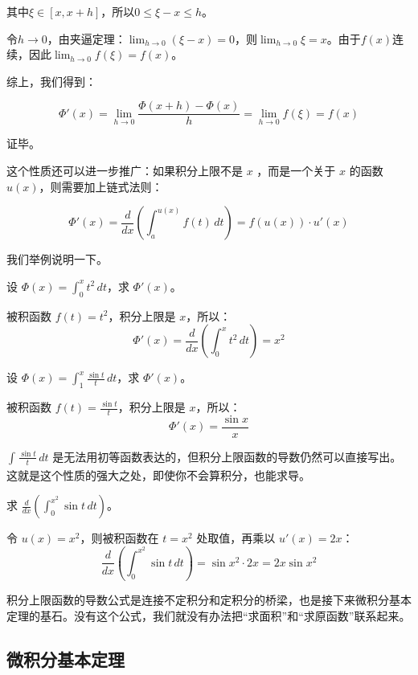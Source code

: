 其中$\xi \in [x,x+h]$，所以$0\leq \xi -x\leq h$。

令$h\rightarrow 0$，由夹逼定理：$\lim_{h \to 0} (\xi -x) = 0 $，则$\lim_{h \to 0} \xi = x $。由于$f(x)$连续，因此$\lim_{h \to 0} f(\xi) = f(x) $。

综上，我们得到：

\[\Phi '(x)=\lim_{h \to 0}  \frac{\Phi (x+h)-\Phi (x)}{h} =\lim_{h \to 0} f(\xi)=f(x)\]

证毕。

这个性质还可以进一步推广：如果积分上限不是 $x$ ，而是一个关于 $x$ 的函数 $u(x)$，则需要加上链式法则：

\[
\Phi '(x)=\frac{d}{dx} (\int_a^{u(x)} f(t)\, dt) = f(u(x)) \cdot u'(x)
\]


我们举例说明一下。

\begin{myexample}
  设 $\Phi(x) = \int_0^x t^2\, dt$，求 $\Phi'(x)$。

  被积函数 $f(t) = t^2$，积分上限是 $x$，所以：
  \[
  \Phi'(x) = \frac{d}{dx} (\int_0^x t^2\, dt) = x^2
  \]
\end{myexample}

\begin{myexample}
  设 $\Phi(x) = \int_1^x \frac{\sin t}{t}\, dt$，求 $\Phi'(x)$。

  被积函数 $f(t) = \frac{\sin t}{t}$，积分上限是 $x$，所以：
  \[
  \Phi'(x) = \frac{\sin x}{x}
  \]

\end{myexample}

  $\int_{}^{} \frac{\sin t}{t} \,dt $ 是无法用初等函数表达的，但积分上限函数的导数仍然可以直接写出。这就是这个性质的强大之处，即使你不会算积分，也能求导。

\begin{myexample}
  求 $\frac{d}{dx} (\int_0^{x^2} \sin t\, dt)$。

  令 $u(x) = x^2$，则被积函数在 $t = x^2$ 处取值，再乘以 $u'(x) = 2x$：
  \[
  \frac{d}{dx} (\int_0^{x^2} \sin t\, dt) = \sin x^2 \cdot 2x = 2x\sin x^2
  \]
\end{myexample}

积分上限函数的导数公式是连接不定积分和定积分的桥梁，也是接下来微积分基本定理的基石。没有这个公式，我们就没有办法把“求面积”和“求原函数”联系起来。


\subsection{微积分基本定理}

